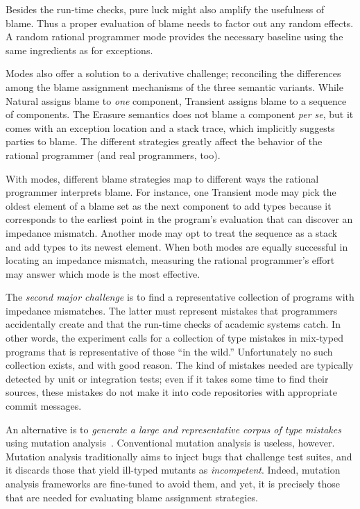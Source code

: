 Besides the run-time checks, pure luck might also amplify the usefulness
of blame. Thus a proper evaluation of blame needs to factor out any random
effects. A random rational programmer mode provides the necessary baseline
using the same ingredients as for exceptions. 

Modes also offer a solution to a derivative challenge; reconciling the
differences among the blame assignment mechanisms of the three semantic variants.
While Natural assigns blame to {\em one\/} component, Transient assigns
blame to a sequence of components. The Erasure semantics does not blame a
component {\it per se\/}, but it comes with an exception location and a
stack trace, which implicitly suggests parties to blame.  The different
strategies greatly affect the behavior of the rational programmer (and
real programmers, too).


With modes, different blame strategies map to different ways the rational
programmer  interprets blame.  For instance, one Transient mode may pick
the oldest element of a blame set as the next component to add types
because it corresponds to the earliest point in the program's evaluation
that can discover an impedance mismatch.  Another mode may opt to treat
the sequence as a stack and add types to its newest element.  When both
modes are equally successful in locating an impedance mismatch,
measuring the rational programmer's effort may answer which mode is the
most effective.



The {\em second major challenge\/} is to find a representative collection of
programs with impedance mismatches. The latter must represent mistakes that programmers
accidentally create and that the run-time checks of academic systems catch. In
other words, the experiment calls for a collection of type mistakes in
mix-typed programs that is representative of those ``in the wild.''
Unfortunately no such collection exists, and with good reason. The kind of
mistakes needed are typically detected by unit or integration tests; even if it
takes some time to find their sources, these mistakes do not make it into code
repositories with appropriate commit messages.

An alternative is to {\em generate a large and representative corpus of type
mistakes \/} using mutation analysis~\cite{lipton1971fault, demillo1978hints,
jia2011analysis}. Conventional mutation analysis is useless, however.  Mutation
analysis traditionally aims to inject bugs that challenge test suites, and it
discards those that yield ill-typed mutants as \emph{incompetent}. Indeed,
mutation analysis frameworks are fine-tuned to avoid them, and yet, it is
precisely those that are needed for evaluating blame assignment strategies.

